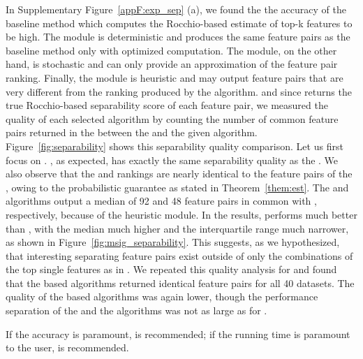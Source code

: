  In Supplementary Figure~\ref{appF:exp_sep} (a), we found the the accuracy of the baseline method which computes the Rocchio-based estimate of top-k features to be high. The \earlyT module is deterministic and produces the same \topk feature pairs as the baseline method only with optimized computation. The \sampling module, on the other hand, is stochastic and can only provide an approximation of the \topk feature pair ranking. Finally, the \traversal module is heuristic and may output \topk feature pairs that are very different from the ranking produced by the \baseline algorithm.
and since \baseline returns the true Rocchio-based separability score of each feature pair, we measured the quality of each selected algorithm by counting the number of common feature pairs returned in the \tophundred between the \baseline and the given algorithm. Figure~\ref{fig:separability} shows this separability quality comparison. Let us first focus on \msig. \earlyOrder, as expected, has exactly the same separability quality as the \baseline. We also observe that the \samp and \sampOpt rankings are nearly identical to the \tophundred feature pairs of the \baseline, owing to the probabilistic guarantee as stated in Theorem~\ref{them:est}. The \horiz and \vertic algorithms output a median of 92 and 48 feature pairs in common with \baseline, respectively, because of the heuristic \traversal module. In the \msig results, \horiz performs much better than \vertic, with the median much higher and the interquartile range much narrower, as shown in Figure~\ref{fig:msig_separability}. This suggests, as we hypothesized, that interesting separating feature pairs exist outside of only the combinations of the top single features as in \vertic. We repeated this quality analysis for \lincs and found that the \sampling based algorithms returned identical \tophundred feature pairs for all 40 datasets. The quality of the \traversal based algorithms was again lower, though the performance separation of the \horiz and the \vertic algorithms was not as large as for \msig.

 If the accuracy is paramount,
\sampOpt is recommended; if the running time is paramount to the user, \horiz is recommended.


